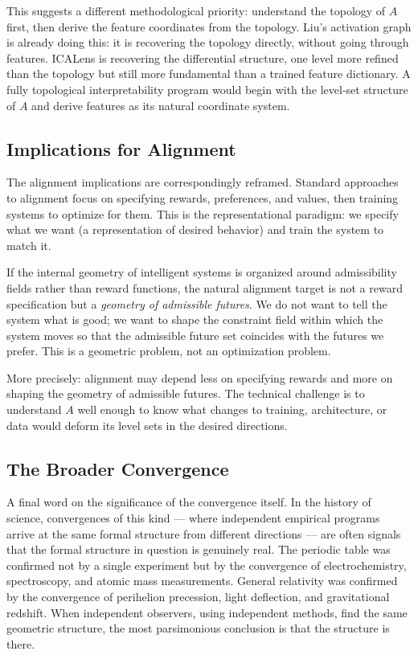 \documentclass[12pt, a4paper]{article}
\theoremstyle{plain}
\theoremstyle{definition}
\theoremstyle{remark}
\newcommand{\fA}{A}
\begin{document}
This suggests a different methodological priority: understand the topology of
$\fA$ first, then derive the feature coordinates from the topology. Liu's
activation graph is already doing this: it is recovering the topology directly,
without going through features. ICALens is recovering the differential
structure, one level more refined than the topology but still more fundamental
than a trained feature dictionary. A fully topological interpretability program
would begin with the level-set structure of $\fA$ and derive features as its
natural coordinate system.

\subsection{Implications for Alignment}

The alignment implications are correspondingly reframed. Standard approaches
to alignment focus on specifying rewards, preferences, and values, then
training systems to optimize for them. This is the representational paradigm:
we specify what we want (a representation of desired behavior) and train the
system to match it.

If the internal geometry of intelligent systems is organized around
admissibility fields rather than reward functions, the natural alignment
target is not a reward specification but a \emph{geometry of admissible
futures}. We do not want to tell the system what is good; we want to shape the
constraint field within which the system moves so that the admissible future
set coincides with the futures we prefer. This is a geometric problem, not an
optimization problem.

More precisely: alignment may depend less on specifying rewards and more on
shaping the geometry of admissible futures. The technical challenge is to
understand $\fA$ well enough to know what changes to training, architecture,
or data would deform its level sets in the desired directions.

\subsection{The Broader Convergence}

A final word on the significance of the convergence itself. In the history of
science, convergences of this kind --- where independent empirical programs
arrive at the same formal structure from different directions --- are often
signals that the formal structure in question is genuinely real. The periodic
table was confirmed not by a single experiment but by the convergence of
electrochemistry, spectroscopy, and atomic mass measurements. General
relativity was confirmed by the convergence of perihelion precession, light
deflection, and gravitational redshift. When independent observers, using
independent methods, find the same geometric structure, the most parsimonious
conclusion is that the structure is there.
\end{document}
